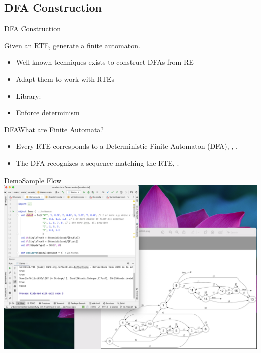 \subsection{DFA Construction}

{  
\begin{frame}{ DFA Construction}

  Given an RTE, generate a finite automaton.

  \begin{itemize}
  \item Well-known techniques exists to construct DFAs from RE
  \item Adapt them to work with RTEs
  \item Library: 
  \item Enforce determinism
  \end{itemize}
\end{frame}

}

\begin{frame}{DFA}{What are Finite Automata?}
  \scalebox{0.75}{}
  \begin{itemize}
  \item   Every RTE corresponds to a Deterministic Finite Automaton (DFA), , .

  \item   The DFA recognizes a sequence matching the RTE, .

  \end{itemize}
\end{frame}



\begin{frame}{Demo}{Sample Flow}
  \centering
   \includegraphics[height=0.8\textheight]{demo.png}
\end{frame}


